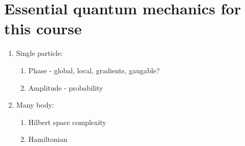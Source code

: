 \section{Essential quantum mechanics for this course}

\begin{enumerate}
	\item Single particle:
		\begin{enumerate}
			\item Phase - global, local, gradients, gaugable?
			\item Amplitude - probability
		\end{enumerate}
	\item Many body:
		\begin{enumerate}
			\item Hilbert space complexity
			\item Hamiltonian
		\end{enumerate}
\end{enumerate}
